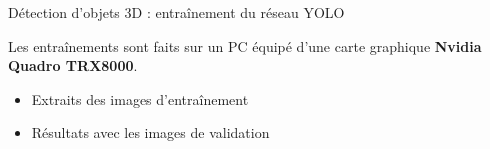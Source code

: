 \documentclass[11pt,serif,mathserif,compress,hyperref={colorlinks}]{beamer}
\begin{document}
\begin{frame}{Détection d'objets 3D : entraînement du réseau YOLO}
  
  Les entraînements sont faits sur un PC équipé d'une carte graphique \textbf{Nvidia Quadro TRX8000}.

  \begin{tcolorbox}[title={Contenu des dossiers\\ \textbf{UCIA-YOLOvvv/batch-BB\_epo-EEE/}}, add to width=.7cm, height=60mm]
    
    \begin{itemize} 
    \item<2-> Extraits des images d'entraînement\\
    \item<4-> Résultats avec les images de validation  \\

\end{itemize}
\end{tcolorbox}
\end{frame}
\end{document}
